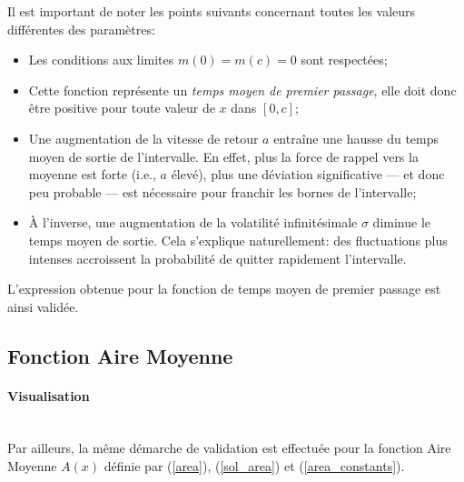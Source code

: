 Il est important de noter les points suivants concernant toutes les valeurs différentes des paramètres:
\begin{itemize}
    \item Les conditions aux limites $m(0)=m(c)=0$ sont respectées;
    \item Cette fonction représente un \textit{temps moyen de premier passage}, elle doit donc être positive pour toute valeur de $x$ dans $[0,c]$;
    \item Une augmentation de la vitesse de retour $a$ entraîne une hausse du temps moyen de sortie de l'intervalle. En effet, plus la force de rappel vers la moyenne est forte (i.e., $a$ élevé), plus une déviation significative — et donc peu probable — est nécessaire pour franchir les bornes de l'intervalle;
    \item À l'inverse, une augmentation de la volatilité infinitésimale $\sigma$ diminue le temps moyen de sortie. Cela s'explique naturellement: des fluctuations plus intenses accroissent la probabilité de quitter rapidement l'intervalle.
\end{itemize}

L'expression obtenue pour la fonction de temps moyen de premier passage est ainsi validée.

\subsection{Fonction Aire Moyenne}

\paragraph{Visualisation}\phantom{}\\
Par ailleurs, la même démarche de validation est effectuée pour la fonction Aire Moyenne $A(x)$ définie par (\ref{area}), (\ref{sol_area}) et (\ref{area_constants}).

